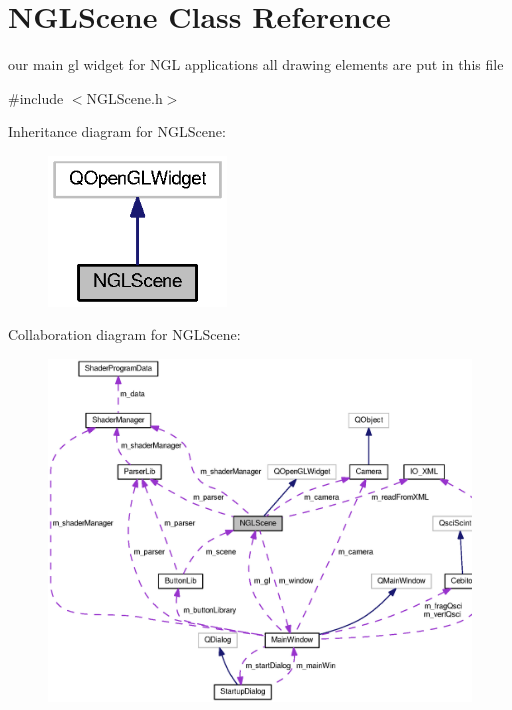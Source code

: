 \section{N\-G\-L\-Scene Class Reference}
\label{class_n_g_l_scene}


our main gl widget for N\-G\-L applications all drawing elements are put in this file  




{\ttfamily \#include $<$N\-G\-L\-Scene.\-h$>$}



Inheritance diagram for N\-G\-L\-Scene\-:\nopagebreak
\begin{figure}[H]
\begin{center}
\leavevmode
\includegraphics[width=134pt]{class_n_g_l_scene__inherit__graph}
\end{center}
\end{figure}


Collaboration diagram for N\-G\-L\-Scene\-:\nopagebreak
\begin{figure}[H]
\begin{center}
\leavevmode
\includegraphics[width=350pt]{class_n_g_l_scene__coll__graph}
\end{center}
\end{figure}

